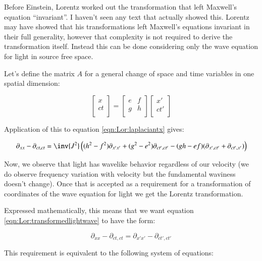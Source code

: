 Before Einstein, Lorentz worked out the transformation that left Maxwell's equation ``invariant''.  I haven't seen 
any text that actually showed this.  Lorentz may have showed that his transformations left Maxwell's equations 
invariant in their full generality, however that complexity is not required to derive the transformation itself.  Instead
this can be done considering only the wave equation for light in source free space.

Let's define the matrix $A$ for a general change of space and time variables in one spatial dimension:

\begin{equation}
\begin{bmatrix}
x \\
ct \\
\end{bmatrix}
=
\begin{bmatrix}
e & f \\
g & h \\
\end{bmatrix}
\begin{bmatrix}
x' \\
c t' \\
\end{bmatrix}
\end{equation}

Application of this to equation \ref{eqn:Lor:laplaciantx} gives:

\begin{equation}\label{eqn:Lor:transformedlightwave}
\partial_{xx} -\partial_{ct,ct} =
\inv{J^2} 
\left(
(h^2 - f^2)\partial_{x'x'} 
+(g^2 - e^2)\partial_{ct',ct'} 
-(g h - e f)( \partial_{x',ct'} + \partial_{ct',x'}  )
\right)
\end{equation}

Now, we observe that light has wavelike behavior regardless of our velocity (we do observe frequency variation with 
velocity but the fundamental waviness doesn't change).  Once that is accepted as a requirement for a transformation
of coordinates of the wave equation for light we get the Lorentz transformation.  

Expressed mathematically, this means that we want equation \ref{eqn:Lor:transformedlightwave} to have the form:

\begin{equation}
\partial_{xx} -\partial_{ct,ct} = \partial_{x'x'} -\partial_{ct',ct'}
\end{equation}

This requirement is equivalent to the following system of equations:

